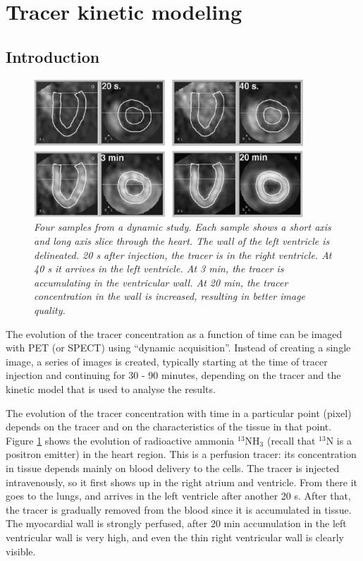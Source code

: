 \documentclass[11pt,oneside]{book}
\begin{document}
\section{Tracer kinetic modeling}
\subsection{Introduction}
\begin{figure}[tb]
\centering
\includegraphics[width=0.9\textwidth]{figs/fig_dyncardio.pdf}
\caption{\label{fig:dyncardio} \emph{Four samples from a dynamic
study. Each sample shows a short axis and long axis slice through the
heart. The wall of the left ventricle is delineated. 20 s after
injection, the tracer is in the right ventricle. At 40 s it arrives in
the left ventricle. At 3 min, the tracer is accumulating in the
ventricular wall. At 20 min, the tracer concentration in the wall is
increased, resulting in better image quality.}}
\end{figure}

The evolution of the tracer concentration as a function of time can be
imaged with PET (or SPECT) using ``dynamic acquisition''. Instead of
creating a single image, a series of images is created, typically
starting at the time of tracer injection and continuing for 30 - 90
minutes, depending on the tracer and the kinetic model that is used to
analyse the results.

The evolution of the tracer concentration with time in a particular
point (pixel) depends on the tracer and on the characteristics of the
tissue in that point. Figure \ref{fig:dyncardio} shows the evolution
of radioactive ammonia $^{13}$NH$_3$ (recall that $^{13}$N is a
positron emitter) in the heart region. This is a perfusion tracer: its
concentration in tissue depends mainly on blood delivery to the
cells. The tracer is injected intravenously, so it first shows up in
the right atrium and ventricle. From there it goes to the lungs, and
arrives in the left ventricle after another 20 s. After that, the
tracer is gradually removed from the blood since it is accumulated in
tissue. The myocardial wall is strongly perfused, after 20 min
accumulation in the left ventricular wall is very high, and even the
thin right ventricular wall is clearly visible.
\end{document}
